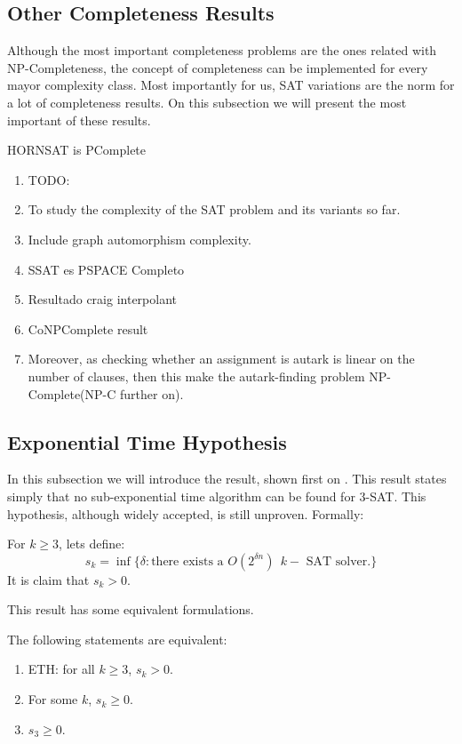 \subsection{Other Completeness Results}

Although the most important completeness problems are the ones related with NP-Completeness, the concept of completeness can be implemented for every mayor complexity class. Most importantly for us, SAT variations are the norm for a lot of completeness results. On this subsection we will present the most important of these results.


\begin{theorem}\label{theorem:hornsat}  HORNSAT is PComplete
  \end{theorem}

\begin{enumerate}
  \item TODO:
  \item To study the complexity of the SAT problem and its variants so far.
  \item Include graph automorphism complexity.
  \item SSAT es PSPACE Completo
  \item Resultado craig interpolant
  \item CoNPComplete result
  \item Moreover, as checking whether an assignment is autark is linear on the number of clauses, then this make the autark-finding problem NP-Complete(NP-C further on).
  \end{enumerate}

\subsection{Exponential Time Hypothesis}
\label{hyp:exponential_time}
In this subsection we will introduce the result, shown first on \cite{impagliazzo2001complexity}. This result states simply that no sub-exponential time algorithm can be found for 3-SAT. This hypothesis, although widely accepted, is still unproven. Formally:

\begin{definition}[ETH]
  For $k\ge 3$, lets define:
  $$s_k=\inf\{\delta: \text{there exists a } O(2^{\delta n})\ \ k-\text{ SAT solver.}\}$$
  It is claim that $s_k>0$.
\end{definition}

This result has some equivalent formulations.

\begin{proposition}
  The following statements are equivalent:
  \begin{enumerate}
  \item ETH: for all $k\ge 3$, $s_k > 0$.
  \item For some $k$, $s_k \ge 0$.
  \item $s_3 \ge 0$.

  \end{enumerate}
  \end{proposition}

